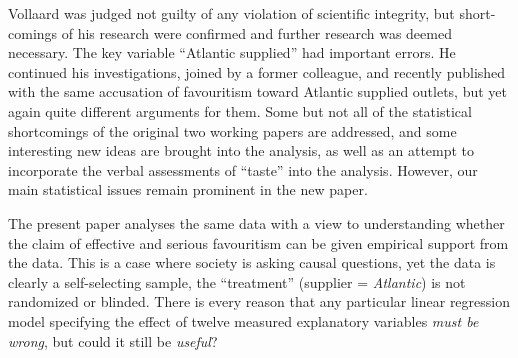 \documentclass[alpha-refs]{wiley-article}
\newcommand{\fn}[1]{\textcolor{purple}{#1}}
\begin{document}
Vollaard was judged not guilty of any violation of scientific integrity, but short-comings of his research were confirmed and further research was deemed necessary. The key variable ``Atlantic supplied'' had important errors. He continued his investigations, joined by a former colleague, and recently published \citet{vollaard2021bias} with the same accusation of favouritism toward Atlantic supplied outlets, but yet again quite different arguments for them. 
Some but not all of the statistical shortcomings of the original two working papers are addressed, and some interesting new ideas are brought into the analysis, as well as an attempt to incorporate the verbal assessments of ``taste'' into the analysis. 
However, our main statistical issues remain prominent in the new paper. 

The present paper analyses the same data with a view to understanding whether the claim of effective and serious favouritism can be given empirical support from the data. This is a case where society is asking causal questions, yet the data is clearly a self-selecting sample, the ``treatment'' (supplier = \emph{Atlantic}) is not randomized or blinded. There is every reason that any particular linear regression model specifying the effect of twelve measured explanatory variables \emph{must be wrong}, but could it still be \emph{useful}? 
\end{document}
